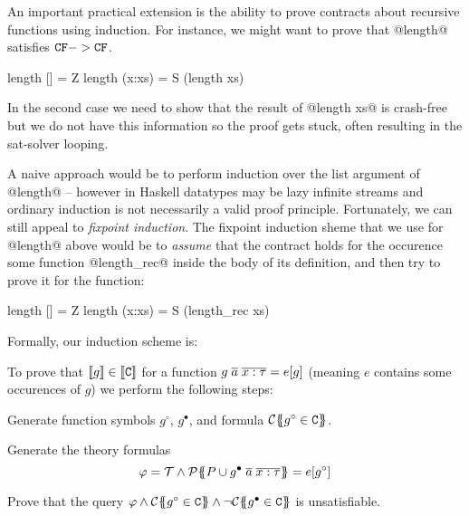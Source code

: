 \label{sect:induction}

An important practical extension is the ability to prove contracts about recursive functions
using induction. For instance, we might want to prove that @length@ satisfies ${\tt CF} -> {\tt CF}$.
\begin{code}
length [] = Z 
length (x:xs) = S (length xs)
\end{code}
In the second case we need to show that the result of @length xs@ is crash-free but we do not 
have this information so the proof gets stuck, often resulting in the sat-solver looping. 

A naive approach would be to perform induction over the list argument of @length@ -- however
in Haskell datatypes may be lazy infinite streams and ordinary induction is not necessarily 
a valid proof principle. Fortunately, we can still appeal to {\em fixpoint induction}. The 
fixpoint induction sheme that we use for @length@ above would be to {\em assume} that the 
contract holds for the occurence some function @length_rec@ inside the body of its definition, 
and then try to prove it for the function:
\begin{code}
length [] = Z 
length (x:xs) = S (length_rec xs)
\end{code}

Formally, our induction scheme is:
\begin{definition}\label{def:induction}
To prove that $[\![g]\!] \in [\![{\tt C}]\!]$ for a function $g\;\overline{a}\;\overline{x:\tau} = e[g]$ (meaning $e$ contains
some occurences of $g$) we perform the following steps:
\begin{itemize*}
  \item Generate function symbols $g^{\circ}$, $g^{\bullet}$, and formula ${\cal C}\{\!\!\{g^{\circ} \in {\tt C}\}\!\!\}$.
  \item Generate the theory formulas \[ \varphi = {\cal T} \land {\cal P}\{\!\!\{P \cup g^{\bullet}\;\overline{a}\;\overline{x:\tau}\}\!\!\} = e[g^{\circ}] \] 
  \item Prove that the query $\phi \land \ctrans{}{}{g^{\circ} \in \Ct} \land \neg \ctrans{}{}{g^{\bullet} \in \Ct}$
        is unsatisfiable.
\end{itemize*}
\end{definition}


